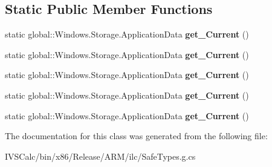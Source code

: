 \subsection*{Static Public Member Functions}
\begin{DoxyCompactItemize}
\item 
\mbox{\label{class_windows_1_1_storage_1_1_application_data_a4351621fe439abb24d50fa87b6145693}} 
static global\+::\+Windows.\+Storage.\+Application\+Data {\bfseries get\+\_\+\+Current} ()
\item 
\mbox{\label{class_windows_1_1_storage_1_1_application_data_a4351621fe439abb24d50fa87b6145693}} 
static global\+::\+Windows.\+Storage.\+Application\+Data {\bfseries get\+\_\+\+Current} ()
\item 
\mbox{\label{class_windows_1_1_storage_1_1_application_data_a4351621fe439abb24d50fa87b6145693}} 
static global\+::\+Windows.\+Storage.\+Application\+Data {\bfseries get\+\_\+\+Current} ()
\item 
\mbox{\label{class_windows_1_1_storage_1_1_application_data_a4351621fe439abb24d50fa87b6145693}} 
static global\+::\+Windows.\+Storage.\+Application\+Data {\bfseries get\+\_\+\+Current} ()
\item 
\mbox{\label{class_windows_1_1_storage_1_1_application_data_a4351621fe439abb24d50fa87b6145693}} 
static global\+::\+Windows.\+Storage.\+Application\+Data {\bfseries get\+\_\+\+Current} ()
\end{DoxyCompactItemize}


The documentation for this class was generated from the following file\+:\begin{DoxyCompactItemize}
\item 
I\+V\+S\+Calc/bin/x86/\+Release/\+A\+R\+M/ilc/Safe\+Types.\+g.\+cs\end{DoxyCompactItemize}
